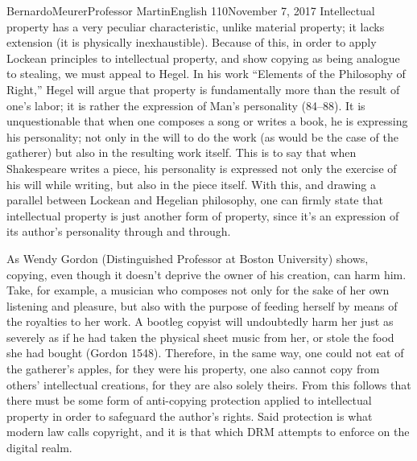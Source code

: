 \documentclass[12pt,letterpaper]{article}
\begin{document}
\begin{mla}{Bernardo}{Meurer}{Professor Martin}{English 110}{November 7, 2017}
        Intellectual property has a very peculiar characteristic, unlike material property; it lacks extension (it is physically inexhaustible). Because of this, in order to apply Lockean principles to intellectual property, and show copying as being analogue to stealing, we must appeal to Hegel. In his work ``Elements of the Philosophy of Right,'' Hegel will argue that property is fundamentally more than the result of one's labor; it is rather the expression of Man's personality (84--88). It is unquestionable that when one composes a song or writes a book, he is expressing his personality; not only in the will to do the work (as would be the case of the gatherer) but also in the resulting work itself. This is to say that when Shakespeare writes a piece, his personality is expressed not only the exercise of his will while writing, but also in the piece itself. With this, and drawing a parallel between Lockean and Hegelian philosophy, one can firmly state that intellectual property is just another form of property, since it's an expression of its author's personality through and through.

        As Wendy Gordon (Distinguished Professor at Boston University) shows, copying, even though it doesn't deprive the owner of his creation, can harm him. Take, for example, a musician who composes not only for the sake of her own listening and pleasure, but also with the purpose of feeding herself by means of the royalties to her work. A bootleg copyist will undoubtedly harm her just as severely as if he had taken the physical sheet music from her, or stole the food she had bought (Gordon 1548). Therefore, in the same way, one could not eat of the gatherer's apples, for they were his property, one also cannot copy from others' intellectual creations, for they are also solely theirs. From this follows that there must be some form of anti-copying protection applied to intellectual property in order to safeguard the author's rights. Said protection is what modern law calls copyright, and it is that which DRM attempts to enforce on the digital realm.


\end{mla}
\end{document}

